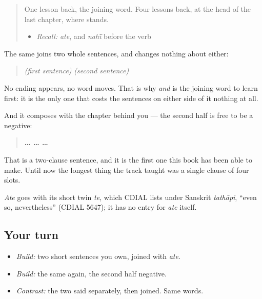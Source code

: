 \begin{quote}
One lesson back, the joining word. Four lessons back, at the head of the last chapter, where \textbf{} stands.

\begin{itemize}
\raggedright
  \item \emph{Recall:} \emph{ate}, and \emph{nahī̃} before the verb
\end{itemize}
\end{quote}

\begin{cousinweb}
The same \textbf{} joins two whole sentences, and changes nothing about either:

\begin{quote}
\emph{(first sentence)} \textbf{} \emph{(second sentence)}
\end{quote}

No ending appears, no word moves. That is why \emph{and} is the joining word to learn first: it is the only one that costs the sentences on either side of it nothing at all.

And it composes with the chapter behind you — the second half is free to be a negative:

\begin{quote}
\textbf{…  …  …}
\end{quote}

That is a two-clause sentence, and it is the first one this book has been able to make. Until now the longest thing the track taught was a single clause of four slots.

\emph{Ate} goes with its short twin \emph{te}, which CDIAL lists under Sanskrit \emph{tathāpi}, \textquotedblleft{}even so, nevertheless\textquotedblright{} (CDIAL 5647); it has no entry for \emph{ate} itself.
\end{cousinweb}

\subsection*{Your turn}
\begin{itemize}
\raggedright
  \item \emph{Build:} two short sentences you own, joined with \emph{ate}.
  \item \emph{Build:} the same again, the second half negative.
  \item \emph{Contrast:} the two said separately, then joined. Same words.
\end{itemize}

